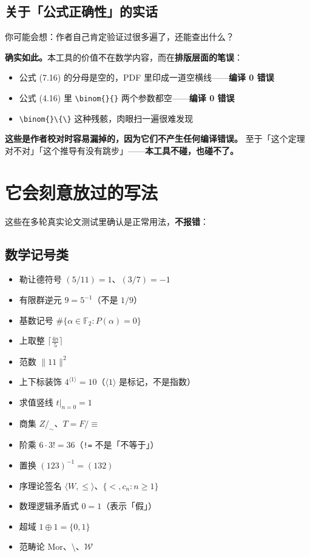 \documentclass[11pt,UTF8]{ctexart}
\begin{document}
\subsection*{关于「公式正确性」的实话}
你可能会想：作者自己肯定验证过很多遍了，还能查出什么？

\textbf{确实如此。}本工具的价值不在数学内容，而在\textbf{排版层面的笔误}：
\begin{itemize}
\item 公式 (7.16) 的分母是空的，PDF 里印成一道空横线——\textbf{编译 0 错误}
\item 公式 (4.16) 里 \verb|\binom{}{}| 两个参数都空——\textbf{编译 0 错误}
\item \verb|\binom{}\{\}| 这种残骸，肉眼扫一遍很难发现
\end{itemize}

\textbf{这些是作者校对时容易漏掉的，因为它们不产生任何编译错误。}
至于「这个定理对不对」「这个推导有没有跳步」——\textbf{本工具不碰，也碰不了。}

\section{它\textbf{会刻意放过}的写法}

这些在多轮真实论文测试里确认是正常用法，\textbf{不报错}：

\subsection*{数学记号类}
\begin{itemize}
\item 勒让德符号 $(5/11)=1$、$(3/7)=-1$
\item 有限群逆元 $9=5^{-1}$（不是 $1/9$）
\item 基数记号 $\#\{\alpha\in\mathbb{F}_2: P(\alpha)=0\}$
\item 上取整 $\lceil\frac{4n}{5}\rceil$
\item 范数 $\lVert 11\rVert^2$
\item 上下标装饰 $4^{\langle1\rangle}=10$（$\langle1\rangle$ 是标记，不是指数）
\item 求值竖线 $t|_{n=0}=1$
\item 商集 $Z/_{\sim}$、$T=F/{\equiv}$
\item 阶乘 $6\cdot 3!=36$（\texttt{!=} 不是「不等于」）
\item 置换 $(123)^{-1}=(132)$
\item 序理论签名 $\langle W,\le\rangle$、$\{<,c_n:n\ge1\}$
\item 数理逻辑矛盾式 $0=1$（表示「假」）
\item 超域 $1\oplus1=\{0,1\}$
\item 范畴论 $\mathrm{Mor}$、$\setminus$、$\mathcal{W}$
\end{itemize}
\end{document}
